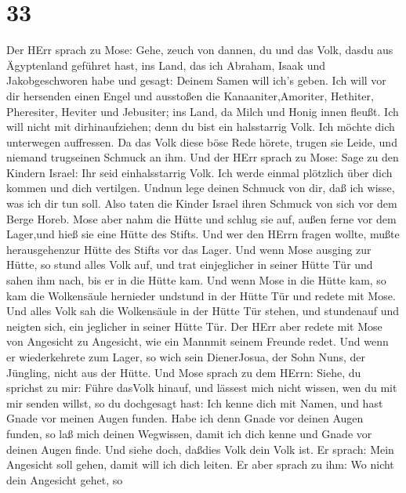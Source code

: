 \hypertarget{section-32}{%
\section{33}\label{section-32}}

 Der HErr sprach zu Mose: Gehe, zeuch von dannen, du und das
Volk, dasdu aus Ägyptenland geführet hast, ins Land, das ich Abraham,
Isaak und Jakobgeschworen habe und gesagt: Deinem Samen will ich's
geben.  Ich will vor dir hersenden einen Engel und ausstoßen
die Kanaaniter,Amoriter, Hethiter, Pheresiter, Heviter und Jebusiter;
 ins Land, da Milch und Honig innen fleußt. Ich will nicht
mit dirhinaufziehen; denn du bist ein halsstarrig Volk. Ich möchte dich
unterwegen auffressen.  Da das Volk diese böse Rede hörete,
trugen sie Leide, und niemand trugseinen Schmuck an ihm. 
Und der HErr sprach zu Mose: Sage zu den Kindern Israel: Ihr seid
einhalsstarrig Volk. Ich werde einmal plötzlich über dich kommen und
dich vertilgen. Undnun lege deinen Schmuck von dir, daß ich wisse, was
ich dir tun soll.  Also taten die Kinder Israel ihren
Schmuck von sich vor dem Berge Horeb.  Mose aber nahm die
Hütte und schlug sie auf, außen ferne vor dem Lager,und hieß sie eine
Hütte des Stifts. Und wer den HErrn fragen wollte, mußte herausgehenzur
Hütte des Stifts vor das Lager.  Und wenn Mose ausging zur
Hütte, so stund alles Volk auf, und trat einjeglicher in seiner Hütte
Tür und sahen ihm nach, bis er in die Hütte kam.  Und wenn
Mose in die Hütte kam, so kam die Wolkensäule hernieder undstund in der
Hütte Tür und redete mit Mose.  Und alles Volk sah die
Wolkensäule in der Hütte Tür stehen, und stundenauf und neigten sich,
ein jeglicher in seiner Hütte Tür.  Der HErr aber redete
mit Mose von Angesicht zu Angesicht, wie ein Mannmit seinem Freunde
redet. Und wenn er wiederkehrete zum Lager, so wich sein DienerJosua,
der Sohn Nuns, der Jüngling, nicht aus der Hütte.  Und Mose
sprach zu dem HErrn: Siehe, du sprichst zu mir: Führe dasVolk hinauf,
und lässest mich nicht wissen, wen du mit mir senden willst, so du
dochgesagt hast: Ich kenne dich mit Namen, und hast Gnade vor meinen
Augen funden.  Habe ich denn Gnade vor deinen Augen funden,
so laß mich deinen Wegwissen, damit ich dich kenne und Gnade vor deinen
Augen finde. Und siehe doch, daßdies Volk dein Volk ist. 
Er sprach: Mein Angesicht soll gehen, damit will ich dich leiten.
 Er aber sprach zu ihm: Wo nicht dein Angesicht gehet, so
